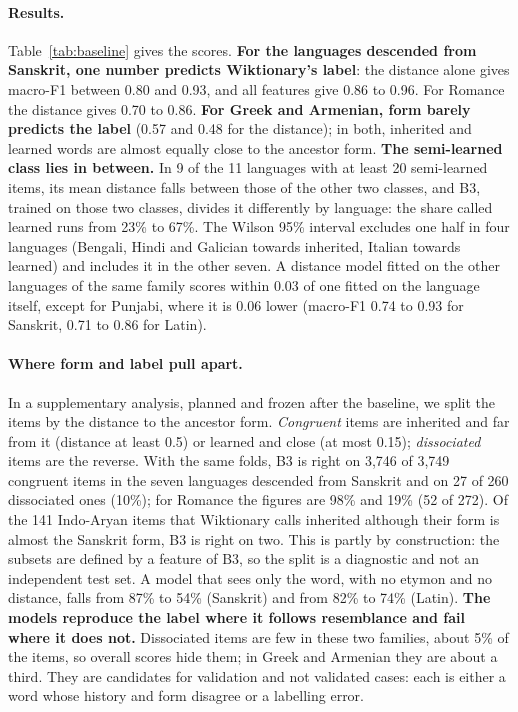 \documentclass[11pt]{article}
\begin{document}
\paragraph{Results.} Table~\ref{tab:baseline} gives the scores. \textbf{For the languages descended from Sanskrit, one number predicts Wiktionary's label}: the distance alone gives macro-F1 between 0.80 and 0.93, and all features give 0.86 to 0.96. For Romance the distance gives 0.70 to 0.86. \textbf{For Greek and Armenian, form barely predicts the label} (0.57 and 0.48 for the distance); in both, inherited and learned words are almost equally close to the ancestor form. \textbf{The semi-learned class lies in between.} In 9 of the 11 languages with at least 20 semi-learned items, its mean distance falls between those of the other two classes, and B3, trained on those two classes, divides it differently by language: the share called learned runs from 23\% to 67\%. The Wilson 95\% interval excludes one half in four languages (Bengali, Hindi and Galician towards inherited, Italian towards learned) and includes it in the other seven. A distance model fitted on the other languages of the same family scores within 0.03 of one fitted on the language itself, except for Punjabi, where it is 0.06 lower (macro-F1 0.74 to 0.93 for Sanskrit, 0.71 to 0.86 for Latin).

\paragraph{Where form and label pull apart.} In a supplementary analysis, planned and frozen after the baseline, we split the items by the distance to the ancestor form. \textit{Congruent} items are inherited and far from it (distance at least 0.5) or learned and close (at most 0.15); \textit{dissociated} items are the reverse. With the same folds, B3 is right on 3,746 of 3,749 congruent items in the seven languages descended from Sanskrit and on 27 of 260 dissociated ones (10\%); for Romance the figures are 98\% and 19\% (52 of 272). Of the 141 Indo-Aryan items that Wiktionary calls inherited although their form is almost the Sanskrit form, B3 is right on two. This is partly by construction: the subsets are defined by a feature of B3, so the split is a diagnostic and not an independent test set. A model that sees only the word, with no etymon and no distance, falls from 87\% to 54\% (Sanskrit) and from 82\% to 74\% (Latin). \textbf{The models reproduce the label where it follows resemblance and fail where it does not.} Dissociated items are few in these two families, about 5\% of the items, so overall scores hide them; in Greek and Armenian they are about a third. They are candidates for validation and not validated cases: each is either a word whose history and form disagree or a labelling error.
\end{document}

